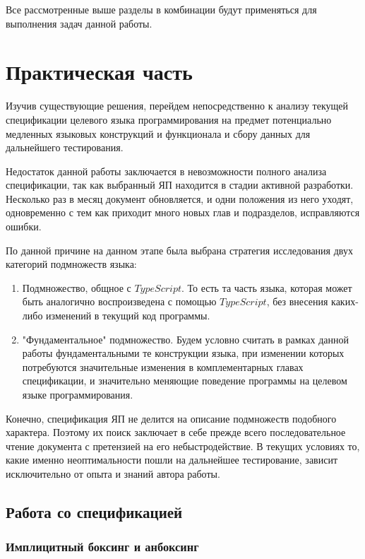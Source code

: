 \documentclass{mipt-thesis-bs}
\begin{document}
Все рассмотренные выше разделы в комбинации будут применяться для выполнения задач 
данной работы.

\chapter{Практическая часть}

Изучив существующие решения, перейдем непосредственно к анализу текущей спецификации
целевого языка программирования на предмет потенциально медленных языковых конструкций и функционала и
сбору данных для дальнейшего тестирования.

Недостаток данной работы заключается в невозможности полного анализа спецификации, так как 
выбранный ЯП находится в стадии активной разработки. Несколько раз в месяц документ обновляется, и одни 
положения из него уходят, одновременно с тем как приходит много новых глав и подразделов, исправляются 
ошибки.

По данной причине на данном этапе была выбрана стратегия исследования двух категорий 
подмножеств языка:

\begin{enumerate}
    \item Подмножество, общное с $TypeScript$. То есть та часть языка, которая может быть аналогично 
    воспроизведена с помощью $TypeScript$, без внесения каких-либо изменений в текущий код программы.
    \item "Фундаментальное" подмножество. Будем условно считать в рамках данной работы фундаментальными
    те конструкции языка, при изменении которых потребуются значительные изменения в
    комплементарных главах спецификации, и значительно меняющие поведение 
    программы на целевом языке программирования.
\end{enumerate}

Конечно, спецификация ЯП не делится на описание подмножеств подобного характера. Поэтому их поиск 
заключает в себе прежде всего последовательное чтение документа с претензией на его небыстродействие.
В текущих условиях то, какие именно неоптимальности пошли на дальнейшее тестирование, зависит
исключительно от опыта и знаний автора работы.

\section{Работа со спецификацией}

\subsection{Имплицитный боксинг и анбоксинг}
\end{document}
